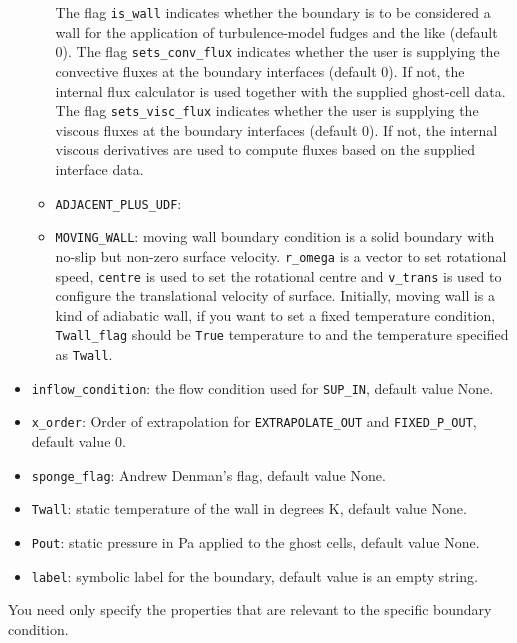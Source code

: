 \begin{itemize}
\begin{itemize}
        The flag \texttt{is\_wall} indicates whether the boundary is to be considered
        a wall for the application of turbulence-model fudges and the like (default 0).
        The flag \texttt{sets\_conv\_flux} indicates whether the user is supplying
        the convective fluxes at the boundary interfaces (default 0).  
        If not, the internal flux calculator is used together with the supplied ghost-cell data.
        The flag \texttt{sets\_visc\_flux} indicates whether the user is supplying
        the viscous fluxes at the boundary interfaces (default 0).  
        If not, the internal viscous derivatives are used to compute fluxes based on the supplied interface data.
      \item \texttt{ADJACENT\_PLUS\_UDF}:
      \item \texttt{MOVING\_WALL}: moving wall boundary condition is a solid boundary with no-slip
        but non-zero surface velocity. \verb!r_omega! is a vector to set rotational speed, \verb!centre! is used to
        set the rotational centre and \verb!v_trans! is used to configure the translational velocity of surface.
        Initially, moving wall is a kind of adiabatic wall, if you want to set a fixed temperature condition,
        \verb!Twall_flag! should be \verb!True! temperature to and the temperature specified as \verb!Twall!.
    \end{itemize}
  \item \texttt{inflow\_condition}: the flow condition used for
    \texttt{SUP\_IN}, default value None.
  \item \texttt{x\_order}: Order of extrapolation for \texttt{EXTRAPOLATE\_OUT} and 
    \texttt{FIXED\_P\_OUT}, default value 0.
  \item \texttt{sponge\_flag}: Andrew Denman's flag, default value None.
  \item \texttt{Twall}: static temperature of the wall in degrees K, default value None.
  \item \texttt{Pout}: static pressure in Pa applied to the ghost cells, default value None.
  \item \texttt{label}: symbolic label for the boundary, default value is an empty string.
\end{itemize}
You need only specify the properties that are relevant to the specific
boundary condition.

\bigskip
